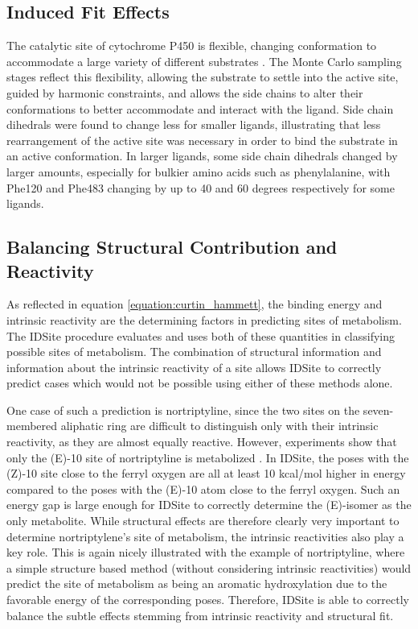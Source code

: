 \subsection{Induced Fit Effects}
\label{subsection:p450/discussion/induced_fit}
The catalytic site of cytochrome P450 is flexible, changing conformation to accommodate a large variety of different substrates \cite{li2004structural,scott2004structure}.
The Monte Carlo sampling stages reflect this flexibility, allowing the substrate to settle into the active site, guided by harmonic constraints, and allows the side chains to alter their conformations to better accommodate and interact with the ligand.
Side chain dihedrals were found to change less for smaller ligands, illustrating that less rearrangement of the active site was necessary in order to bind the substrate in an active conformation.
In larger ligands, some side chain dihedrals changed by larger amounts, especially for bulkier amino acids such as phenylalanine, with Phe120 and Phe483 changing by up to 40 and 60 degrees respectively for some ligands.

\subsection{Balancing Structural Contribution and Reactivity}
\label{subsection:p450/discussion/structure_effects}
As reflected in equation \ref{equation:curtin_hammett}, the binding energy and intrinsic reactivity are the determining factors in predicting sites of metabolism.
The IDSite procedure evaluates and uses both of these quantities in classifying possible sites of metabolism.
The combination of structural information and information about the intrinsic reactivity of a site allows IDSite to correctly predict cases which would not be possible using either of these methods alone.

One case of such a prediction is nortriptyline, since the two sites on the seven-membered aliphatic ring are difficult to distinguish only with their intrinsic reactivity, as they are almost equally reactive.
However, experiments show that only the (E)-10 site of nortriptyline is metabolized \cite{linnet1997metabolism}.
In IDSite, the poses with the (Z)-10 site close to the ferryl oxygen are all at least 10 kcal/mol higher in energy compared to the poses with the (E)-10 atom close to the ferryl oxygen. 
Such an energy gap is large enough for IDSite to correctly determine the (E)-isomer as the only metabolite. 
While structural effects are therefore clearly very important to determine nortriptylene's site of metabolism, the intrinsic reactivities also play a key role. 
This is again nicely illustrated with the example of nortriptyline, where a simple structure based method (without considering intrinsic reactivities) would predict the site of metabolism as being an aromatic hydroxylation due to the favorable energy of the corresponding poses.
Therefore, IDSite is able to correctly balance the subtle effects stemming from intrinsic reactivity and structural fit.

